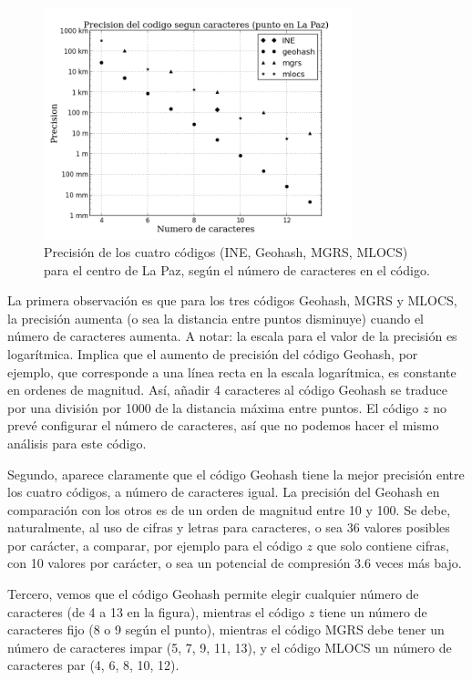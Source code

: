 \documentclass[letterpaper]{article}
\begin{document}
\begin{figure}[p]
    \centering
    \includegraphics[width=0.8\textwidth]{resultados/precision_codigos.png}
    \caption{Precisión de los cuatro códigos (INE, Geohash, MGRS, 
    MLOCS) para el centro de La Paz, según el número de caracteres 
    en el código.}
    \label{fig:precision_codigos}
\end{figure}

La primera observación es que para los tres códigos Geohash, MGRS y 
MLOCS, la precisión aumenta (o sea la distancia entre puntos 
disminuye) cuando el número de caracteres aumenta. A notar: la 
escala para el valor de la precisión es logarítmica. Implica que el 
aumento de precisión del código Geohash, por ejemplo, que 
corresponde a una línea recta en la escala logarítmica, es constante 
en ordenes de magnitud. Así, añadir 4 caracteres al código Geohash 
se traduce por una división por 1000 de la distancia máxima entre 
puntos. El código \(z\) no prevé configurar el número de caracteres, 
así que no podemos hacer el mismo análisis para este código. 

Segundo, aparece claramente que el código Geohash tiene la mejor 
precisión entre los cuatro códigos, a número de caracteres igual. La 
precisión del Geohash en comparación con los otros es de un orden de 
magnitud entre 10 y 100. Se debe, naturalmente, al uso de cifras y 
letras para caracteres, o sea 36 valores posibles por carácter, a 
comparar, por ejemplo para el código \(z\) que solo contiene cifras, 
con 10 valores por carácter, o sea un potencial de compresión 3.6 
veces más bajo.

Tercero, vemos que el código Geohash permite elegir cualquier número 
de caracteres (de 4 a 13 en la figura), mientras el código \(z\) tiene 
un número de caracteres fijo (8 o 9 según el punto), mientras el 
código MGRS debe tener un número de caracteres impar (5, 7, 9, 11, 
13), y el código MLOCS un número de caracteres par (4, 6, 8, 10, 12).
\end{document}
